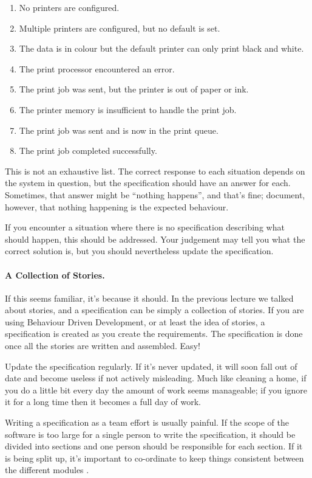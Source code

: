\begin{enumerate}
	\item No printers are configured.
	\item Multiple printers are configured, but no default is set.
	\item The data is in colour but the default printer can only print black and white.
	\item The print processor encountered an error.
	\item The print job was sent, but the printer is out of paper or ink.
	\item The printer memory is insufficient to handle the print job.
	\item The print job was sent and is now in the print queue.
	\item The print job completed successfully.
\end{enumerate}

This is not an exhaustive list. The correct response to each situation depends on the system in question, but the specification should have an answer for each. Sometimes, that answer might be ``nothing happens'', and that's fine; document, however, that nothing happening is the expected behaviour.

If you encounter a situation where there is no specification describing what should happen, this should be addressed. Your judgement may tell you what the correct solution is, but you should nevertheless update the specification.

\paragraph{A Collection of Stories.} If this seems familiar, it's because it should. In the previous lecture we talked about stories, and a specification can be simply a collection of stories. If you are using Behaviour Driven Development, or at least the idea of stories, a specification is created as you create the requirements. The specification is done once all the stories are written and assembled. Easy!

Update the specification regularly. If it's never updated, it will soon fall out of date and become useless if not actively misleading. Much like cleaning a home, if you do a little bit every day the amount of work seems manageable; if you ignore it for a long time then it becomes a full day of work.

Writing a specification as a team effort is usually painful. If the scope of the software is too large for a single person to write the specification, it should be divided into sections and one person should be responsible for each section. If it is being split up, it's important to co-ordinate to keep things consistent between the different modules \cite{spolsky:fs2}.


